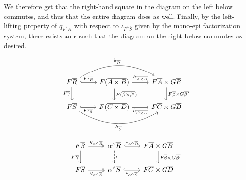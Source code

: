 \documentclass{lmcs}
\theoremstyle{plain}\newtheorem{satz}[thm]{Satz}
\begin{document}
{\noindent
We therefore get that the right-hand square in the diagram on the left
below commutes, and thus that the entire diagram does as well.
Finally, by the left-lifting property of $q_{F^\wedge\overline{R}}$
with respect to $\iota_{F^\wedge\overline{S}}$ given by the mono-epi
factorization system, there exists an $\epsilon$ such that the diagram
on the right below commutes as desired.
\begin{figure*}[ht]
  \vspace*{-0.1in}
  \hspace*{-0.5in}
  \begin{minipage}[b]{0.45\linewidth}
{\footnotesize \[
      \begin{tikzcd}
          F\overline{R}
          \ar[d, "{F\overline{\gamma}}"']
          \ar[r, hookrightarrow, "{F\overline{\iota_R}}"]
          \ar[rr, bend left, "{h_{\overline{R}}}"]
          &F(\overline{A \times B})
          \ar[d, "{F(\overline{\beta \times \beta'})}"]
          \ar[r, "{h_{\overline{A \times B}}}"]
          &F\overline{A} \times G\overline{B}
          \ar[d, "{F\overline{\beta} \times G\overline{\beta'}}"] \\
          F\overline{S}
          \ar[r, hookrightarrow, "{F\overline{\iota_S}}"']
          \ar[rr, bend right, "{h_{\overline{S}}}"']
          &F(\overline{C \times D})
          \ar[r, "{h_{\overline{C \times D}}}"']
          &F\overline{C} \times G\overline{D}
      \end{tikzcd}
      \]}
\end{minipage}
  \vspace*{-0.5in}
  \begin{minipage}[b]{0.45\linewidth}
      {\footnotesize
        \[  \vspace*{0.4in}
      \begin{tikzcd}
          F\overline{R}
          \ar[d, "{F\overline{\gamma}}"']
          \ar[r, twoheadrightarrow, "{q_{\alpha^\wedge\overline{R}}}"]
          &\alpha^\wedge\overline{R}
          \ar[d, dashed, "{\epsilon}"]
          \ar[r, hookrightarrow, "{\iota_{\alpha^\wedge\overline{R}}}"]
          &F\overline{A} \times G\overline{B}
          \ar[d, "{F\overline{\beta} \times G\overline{\beta'}}"] \\
          F\overline{S}
          \ar[r, twoheadrightarrow, "{q_{\alpha^\wedge\overline{S}}}"']
          &\alpha^\wedge\overline{S}
          \ar[r, hookrightarrow, "{\iota_{\alpha^\wedge\overline{S}}}"']
          &F\overline{C} \times G\overline{D}
      \end{tikzcd}
      \]}
\end{minipage}
\end{figure*}


}
\end{document}
